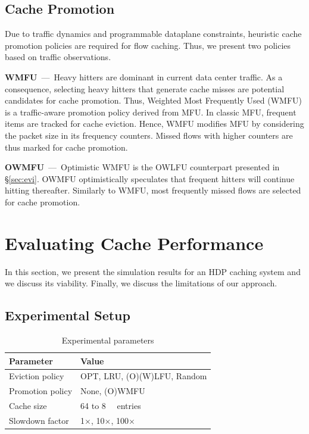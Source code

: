\subsection{Cache Promotion}
Due to traffic dynamics and programmable dataplane constraints, heuristic cache promotion policies are required for flow caching.
Thus, we present two policies based on traffic observations.

\textbf{WMFU}~---~Heavy hitters are dominant in current data center traffic.
As a consequence, selecting heavy hitters that generate cache misses are potential candidates for cache promotion.
Thus, Weighted Most Frequently Used (WMFU) is a traffic-aware promotion policy derived from MFU.
In classic MFU, frequent items are tracked for cache eviction.
Hence, WMFU modifies MFU by considering the packet size in its frequency counters.
Missed flows with higher counters are thus marked for cache promotion.

\textbf{OWMFU}~---~Optimistic WMFU is the OWLFU counterpart presented in \S\ref{sec:evi}.
OWMFU optimistically speculates that frequent hitters will continue hitting thereafter.
Similarly to WMFU, most frequently missed flows are selected for cache promotion.



\section{Evaluating Cache Performance}\label{sec:cache_results}
In this section, we present the simulation results for an HDP caching system and we discuss its viability.
Finally, we discuss the limitations of our approach.

\subsection{Experimental Setup}

\begin{table}[!t]
	\caption{Experimental parameters}
	\label{tab:setup}
	\centering
	\begin{tabular}{l|l}
		\toprule
		\textbf{Parameter}       & \textbf{Value}   \\
		\midrule
		Eviction policy            & OPT, LRU, (O)(W)LFU, Random			    \\
		Promotion policy            & None, (O)WMFU			    \\
		Cache size              & 64 to \SI{8}{\kilo\nothing} entries  \\
		Slowdown factor         & 1$\times$, 10$\times$, 100$\times$        \\
		\bottomrule
	\end{tabular}
\end{table}

